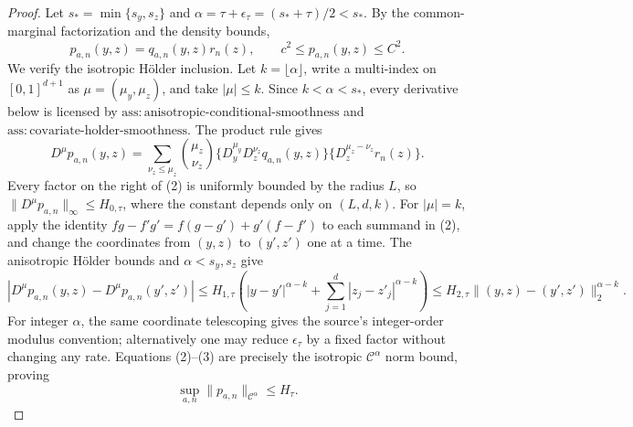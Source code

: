 \documentclass{article}
\begin{document}
\begin{proof}
Let \(s_*=\min\{s_y,s_z\}\) and \(\alpha=\tau+\epsilon_\tau=(s_*+\tau)/2<s_*\). By the common-marginal factorization and the density bounds,
\[
p_{a,n}(y,z)=q_{a,n}(y,z)r_n(z),
\qquad c^2\le p_{a,n}(y,z)\le C^2.                                 \tag{1}
\]
We verify the isotropic H\"older inclusion. Let \(k=\lfloor\alpha\rfloor\), write a multi-index on \([0,1]^{d+1}\) as \(\mu=(\mu_y,\mu_z)\), and take \(|\mu|\le k\). Since \(k<\alpha<s_*\), every derivative below is licensed by \(\mathrm{ass{:}anisotropic\text{-}conditional\text{-}smoothness}\) and \(\mathrm{ass{:}covariate\text{-}holder\text{-}smoothness}\). The product rule gives
\[
D^\mu p_{a,n}(y,z)
=\sum_{\nu_z\le\mu_z}{\mu_z\choose\nu_z}
\{D_y^{\mu_y}D_z^{\nu_z}q_{a,n}(y,z)\}
\{D_z^{\mu_z-\nu_z}r_n(z)\}.                                    \tag{2}
\]
Every factor on the right of (2) is uniformly bounded by the radius \(L\), so \(\|D^\mu p_{a,n}\|_\infty\le H_{0,\tau}\), where the constant depends only on \((L,d,k)\). For \(|\mu|=k\), apply the identity \(fg-f'g'=f(g-g')+g'(f-f')\) to each summand in (2), and change the coordinates from \((y,z)\) to \((y',z')\) one at a time. The anisotropic H\"older bounds and \(\alpha<s_y,s_z\) give
\[
|D^\mu p_{a,n}(y,z)-D^\mu p_{a,n}(y',z')|
\le H_{1,\tau}\left(|y-y'|^{\alpha-k}+\sum_{j=1}^d|z_j-z'_j|^{\alpha-k}\right)
\le H_{2,\tau}\|(y,z)-(y',z')\|_2^{\alpha-k}.                    \tag{3}
\]
For integer \(\alpha\), the same coordinate telescoping gives the source's integer-order modulus convention; alternatively one may reduce \(\epsilon_\tau\) by a fixed factor without changing any rate. Equations (2)--(3) are precisely the isotropic \(\mathcal C^\alpha\) norm bound, proving
\[
\sup_{a,n}\|p_{a,n}\|_{\mathcal C^\alpha}\le H_\tau.            \tag{4}
\]


\end{proof}
\end{document}
